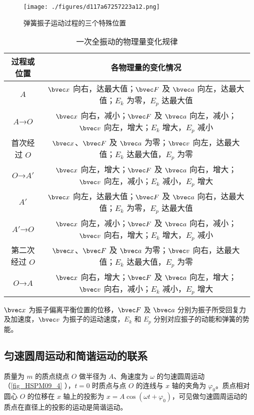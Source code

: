 \begin{figure}[ht]
\centering
\texttt{[image: ./figures/d117a67257223a12.png]}
\caption{弹簧振子运动过程的三个特殊位置} \label{fig_HSPM09_2}
\end{figure}

\begin{table}[ht]
\centering
\caption{一次全振动的物理量变化规律}\label{tab_HSPM09_1}
\begin{tabular}{|c|c|}
\hline
过程或位置 & 各物理量的变化情况 \\
\hline
$A$ & $\bvec x$ 向右，达最大值；$\bvec F$ 及 $\bvec a$ 向左，达最大值；$E_k$ 为零，$E_p$ 达最大值 \\
\hline
$A$→$O$ & $\bvec x$ 向右，减小；$\bvec F$ 及 $\bvec a$ 向左，减小；$\bvec v$ 向左，增大；$E_k$ 增大，$E_p$ 减小 \\
\hline
首次经过 $O$ & $\bvec x$、$\bvec F$ 及 $\bvec a$ 为零；$\bvec v$ 向左，达最大值；$E_k$ 达最大值，$E_p$ 为零 \\
\hline
$O$→$A'$ & $\bvec x$ 向左，增大；$\bvec F$ 及 $\bvec a$ 向右，增大；$\bvec v$ 向左，减小；$E_k$ 减小，$E_p$ 增大 \\
\hline
$A'$ & $\bvec x$ 向左，达最大值；$\bvec F$ 及 $\bvec a$ 向右，达最大值；$E_k$ 为零，$E_p$ 达最大值 \\
\hline
$A'$→$O$ & $\bvec x$ 向左，减小；$\bvec F$ 及 $\bvec a$ 向右，减小；$\bvec v$ 向右，增大；$E_k$ 增大，$E_p$ 减小 \\
\hline
第二次经过 $O$ & $\bvec x$、$\bvec F$ 及 $\bvec a$ 为零；$\bvec v$ 向右，达最大值；$E_k$ 达最大值，$E_p$ 为零 \\
\hline
$O$→$A$ & $\bvec x$ 向右，增大；$\bvec F$ 及 $\bvec a$ 向左，增大；$\bvec v$ 向右，减小；$E_k$ 减小，$E_p$ 增大 \\
\hline
\end{tabular}
\end{table}
$\bvec x$ 为振子偏离平衡位置的位移，$\bvec F$ 及 $\bvec a$ 分别为振子所受回复力及加速度，$\bvec v$ 为振子的运动速度，$E_k$ 和 $E_p$ 分别对应振子的动能和弹簧的势能。

\subsection{匀速圆周运动和简谐运动的联系}

质量为 $m$ 的质点绕点 $O$ 做半径为 $A$、角速度为 $\omega$ 的匀速圆周运动（\autoref{fig_HSPM09_4} ），$t=0$ 时质点与点 $O$ 的连线与 $x$ 轴的夹角为 $\varphi_0$。质点相对圆心 $O$ 的位移在 $x$ 轴上的投影为 $x=A\cos(\omega t + \varphi_0)$，可见做匀速圆周运动的质点在直径上的投影的运动是简谐运动。

